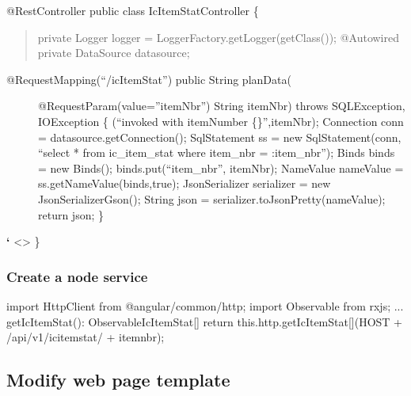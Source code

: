 \documentclass[letterpaper,10pt,english]{sphinxmanual}
\begin{document}
@RestController public class IcItemStatController \{
\begin{quote}

private Logger logger = LoggerFactory.getLogger(getClass());
@Autowired private DataSource datasource;
\end{quote}
\begin{description}
\item[{@RequestMapping(“/icItemStat”) public String planData(}] \leavevmode
@RequestParam(value=”itemNbr”) String itemNbr) throws SQLException,
IOException \{ (“invoked with
itemNumber \{\}”,itemNbr); Connection conn =
datasource.getConnection(); SqlStatement ss = new SqlStatement(conn,
“select * from ic\_item\_stat where item\_nbr = :item\_nbr”); Binds
binds = new Binds(); binds.put(“item\_nbr”, itemNbr); NameValue
nameValue = ss.getNameValue(binds,true); JsonSerializer serializer =
new JsonSerializerGson(); String json =
serializer.toJsonPretty(nameValue); return json; \}

\end{description}

{\color{red}\bfseries{}{}`} \textless{}\textgreater{}
\}


\subsubsection{Create a node service}
\label{\detokenize{100-ABC:create-a-node-service}}
\begin{sphinxVerbatim}[commandchars=\\\{\}]
import \PYGZob{} HttpClient \PYGZcb{} from \PYGZsq{}@angular/common/http\PYGZsq{};
import \PYGZob{} Observable \PYGZcb{} from \PYGZsq{}rxjs\PYGZsq{};
...
getIcItemStat(): Observable\PYGZlt{}IcItemStat[]\PYGZgt{} \PYGZob{}
     return this.http.get\PYGZlt{}IcItemStat[]\PYGZgt{}(HOST + \PYGZsq{}/api/v1/icitemstat/\PYGZsq{} + itemnbr);
 \PYGZcb{}
\end{sphinxVerbatim}


\subsection{Modify web page template}
\label{\detokenize{100-ABC:modify-web-page-template}}
\end{document}
